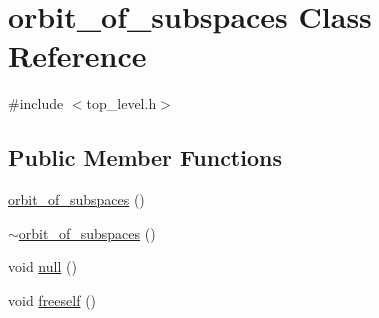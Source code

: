 \hypertarget{classorbit__of__subspaces}{}\section{orbit\+\_\+of\+\_\+subspaces Class Reference}
\label{classorbit__of__subspaces}


{\ttfamily \#include $<$top\+\_\+level.\+h$>$}

\subsection*{Public Member Functions}
\begin{DoxyCompactItemize}
\item 
\mbox{\hyperlink{classorbit__of__subspaces_a8480d53da3072fc761793a3e775d3c95}{orbit\+\_\+of\+\_\+subspaces}} ()
\item 
\mbox{\hyperlink{classorbit__of__subspaces_aee7b7cb69f335a267c62a543761ceaa2}{$\sim$orbit\+\_\+of\+\_\+subspaces}} ()
\item 
void \mbox{\hyperlink{classorbit__of__subspaces_a2171f35b76e2c067abf69d07e2bce04b}{null}} ()
\item 
void \mbox{\hyperlink{classorbit__of__subspaces_a3157117462ce7ecbf8bf7eba61998f5a}{freeself}} ()
\item 

\end{DoxyCompactItemize}
